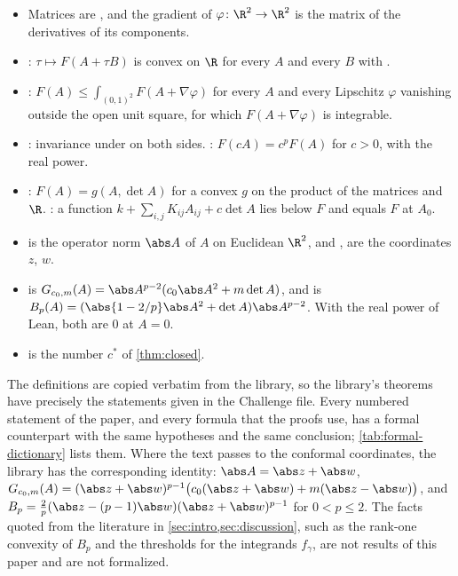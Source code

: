 {\sloppy
\begin{itemize}
\item Matrices are , and the gradient of
  $\varphi\colon\R^2\to\R^2$ is the matrix  of the derivatives of its
  components.
\item {}: $\tau\mapsto F(A+\tau B)$ is convex on $\R$ for every $A$ and
  every $B$ with .
\item {}: $F(A)\le\int_{(0,1)^2}F(A+\nabla\varphi)$ for every $A$ and every
  Lipschitz $\varphi$ vanishing outside the open unit square, for which $F(A+\nabla\varphi)$ is
  integrable.
\item {}: invariance under
   on both sides. :
  $F(cA)=c^pF(A)$ for $c>0$, with the real power.
\item {}: $F(A)=g(A,\det A)$ for a convex $g$ on the product of the matrices
  and $\R$. : a function
  $k+\sum_{i,j}K_{ij}A_{ij}+c\det A$ lies below $F$ and equals $F$ at $A_0$.
\item {} is the operator norm $\abs A$ of $A$ on Euclidean $\R^2$, and
  ,  are the coordinates $z$, $w$.
\item {} is $G_{c_0,m}(A)=\abs A^{p-2}(c_0\abs A^2+m\det A)$,
  and  is $B_p(A)=(\abs{1-2/p}\abs A^2+\det A)\abs A^{p-2}$. With the real
  power of Lean, both are $0$ at $A=0$.
\item {} is the number $c^\ast$ of \cref{thm:closed}.
\end{itemize}\par}
The definitions are copied verbatim from the library, so the library's theorems have precisely
the statements given in the Challenge file. Every numbered statement of the paper, and every
formula that the proofs use, has a formal counterpart with the same hypotheses and the same
conclusion; \cref{tab:formal-dictionary} lists them. Where the text passes to the conformal
coordinates, the library has the corresponding identity: $\abs A=\abs z+\abs w$,
$G_{c_0,m}(A)=(\abs z+\abs w)^{p-1}\bigl(c_0(\abs z+\abs w)+m(\abs z-\abs w)\bigr)$, and
$B_p=\tfrac2p(\abs z-(p-1)\abs w)(\abs z+\abs w)^{p-1}$ for $0<p\le2$. The facts quoted from the
literature in \cref{sec:intro,sec:discussion}, such as the rank-one convexity of $B_p$ and the
thresholds for the integrands $f_\gamma$, are not results of this paper and are not formalized.

